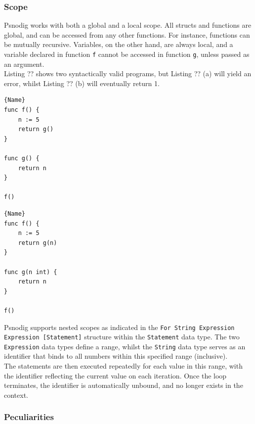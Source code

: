 \subsubsection{Scope}

Psnodig works with both a global and a local scope. All structs and functions are global, and can be accessed from any other functions. For instance, functions can be mutually recursive. Variables, on the other hand, are always local, and a variable declared in function \texttt{f} cannot be accessed in function \texttt{g}, unless passed as an argument. \\

Listing ?? shows two syntactically valid programs, but Listing ?? (a) will yield an error, whilst Listing ?? (b) will eventually return 1. \\

\begin{minipage}{.45\textwidth}
\begin{lstlisting}[caption=Code with error, captionpos=b, frame=tlrb]{Name}
func f() {
    n := 5
    return g()
}

func g() {
    return n
}

f()
\end{lstlisting}
\end{minipage}\hfill
\begin{minipage}{.45\textwidth}
\begin{lstlisting}[caption=Code without error, captionpos=b, frame=tlrb]{Name}
func f() {
    n := 5
    return g(n)
}

func g(n int) {
    return n
}

f()
\end{lstlisting}
\end{minipage}

Psnodig supports nested scopes as indicated in the \texttt{For String Expression Expression [Statement]} structure within the \texttt{Statement} data type. The two \texttt{Expression} data types define a range, whilst the \texttt{String} data type serves as an identifier that binds to all numbers within this specified range (inclusive). \\

The statements are then executed repeatedly for each value in this range, with the identifier reflecting the current value on each iteration. Once the loop terminates, the identifier is automatically unbound, and no longer exists in the context.

\subsubsection{Peculiarities}

